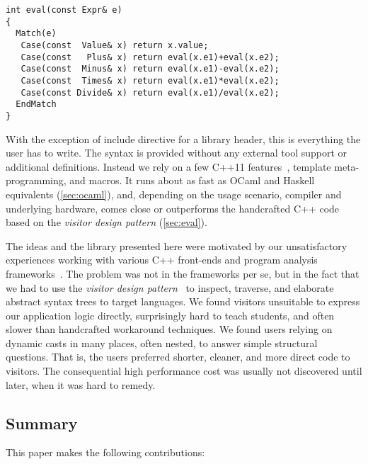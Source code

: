 
\begin{lstlisting}[columns=flexible]
int eval(const Expr& e)
{
  Match(e)
   Case(const  Value& x) return x.value;
   Case(const   Plus& x) return eval(x.e1)+eval(x.e2);
   Case(const  Minus& x) return eval(x.e1)-eval(x.e2);
   Case(const  Times& x) return eval(x.e1)*eval(x.e2);
   Case(const Divide& x) return eval(x.e1)/eval(x.e2);
  EndMatch
}
\end{lstlisting}

\noindent
With the exception of include directive for a library header, this is everything the user has to write.
The syntax is provided without any external tool support or additional definitions. Instead we rely on a 
few C++11 features~\cite{C++11}, template meta-programming, and macros. It runs 
about as fast as OCaml and Haskell equivalents (\textsection\ref{sec:ocaml}), and, depending 
on the usage scenario, compiler and underlying hardware, comes close or 
outperforms the handcrafted C++ code based on the \emph{visitor design pattern} 
(\textsection\ref{sec:eval}).

The ideas and the library presented here were motivated by our unsatisfactory experiences 
working with various C++ front-ends and program analysis 
frameworks~\cite{Pivot09,Phoenix,Clang}.
The problem was not in the frameworks per se, but in the fact that we had to use
the \emph{visitor design pattern}~\cite{DesignPatterns1993} to inspect, traverse, and 
elaborate abstract syntax trees to target languages. We found visitors 
unsuitable to express our application logic directly, surprisingly hard to teach 
students, and often slower than handcrafted workaround techniques.
We found users relying on dynamic casts in many places, often nested, to answer simple structural 
questions. That is, the users preferred shorter, cleaner, and more direct code 
to visitors. The consequential high performance cost was usually not discovered
until later, when it was hard to remedy.

\subsection{Summary}

This paper makes the following contributions:

